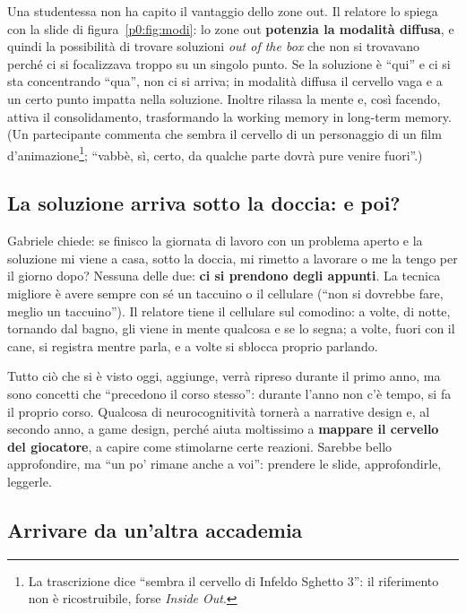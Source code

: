 Una studentessa non ha capito il vantaggio dello zone out. Il relatore lo
spiega con la slide di figura~\ref{p0:fig:modi}: lo zone out
\textbf{potenzia la modalità diffusa}, e quindi la possibilità di trovare
soluzioni \emph{out of the box} che non si trovavano perché ci si
focalizzava troppo su un singolo punto. Se la soluzione è ``qui'' e ci si sta
concentrando ``qua'', non ci si arriva; in modalità diffusa il cervello vaga
e a un certo punto impatta nella soluzione. Inoltre rilassa la mente e, così
facendo, attiva il consolidamento, trasformando la working memory in
long-term memory. (Un partecipante commenta che sembra il cervello di un
personaggio di un film d'animazione\footnote{La trascrizione dice ``sembra
il cervello di Infeldo Sghetto 3'': il riferimento non è ricostruibile,
forse \emph{Inside Out}.}; ``vabbè, sì, certo, da qualche parte dovrà pure
venire fuori''.)

\subsection{La soluzione arriva sotto la doccia: e poi?}

Gabriele chiede: se finisco la giornata di lavoro con un problema aperto e
la soluzione mi viene a casa, sotto la doccia, mi rimetto a lavorare o me la
tengo per il giorno dopo? Nessuna delle due: \textbf{ci si prendono degli
appunti}. La tecnica migliore è avere sempre con sé un taccuino o il
cellulare (``non si dovrebbe fare, meglio un taccuino''). Il relatore tiene
il cellulare sul comodino: a volte, di notte, tornando dal bagno, gli viene
in mente qualcosa e se lo segna; a volte, fuori con il cane, si registra
mentre parla, e a volte si sblocca proprio parlando.

Tutto ciò che si è visto oggi, aggiunge, verrà ripreso durante il primo
anno, ma sono concetti che ``precedono il corso stesso'': durante l'anno non
c'è tempo, si fa il proprio corso. Qualcosa di neurocognitività tornerà a
narrative design e, al secondo anno, a game design, perché aiuta moltissimo
a \textbf{mappare il cervello del giocatore}, a capire come stimolarne certe
reazioni. Sarebbe bello approfondire, ma ``un po' rimane anche a voi'':
prendere le slide, approfondirle, leggerle.

\subsection{Arrivare da un'altra accademia}


